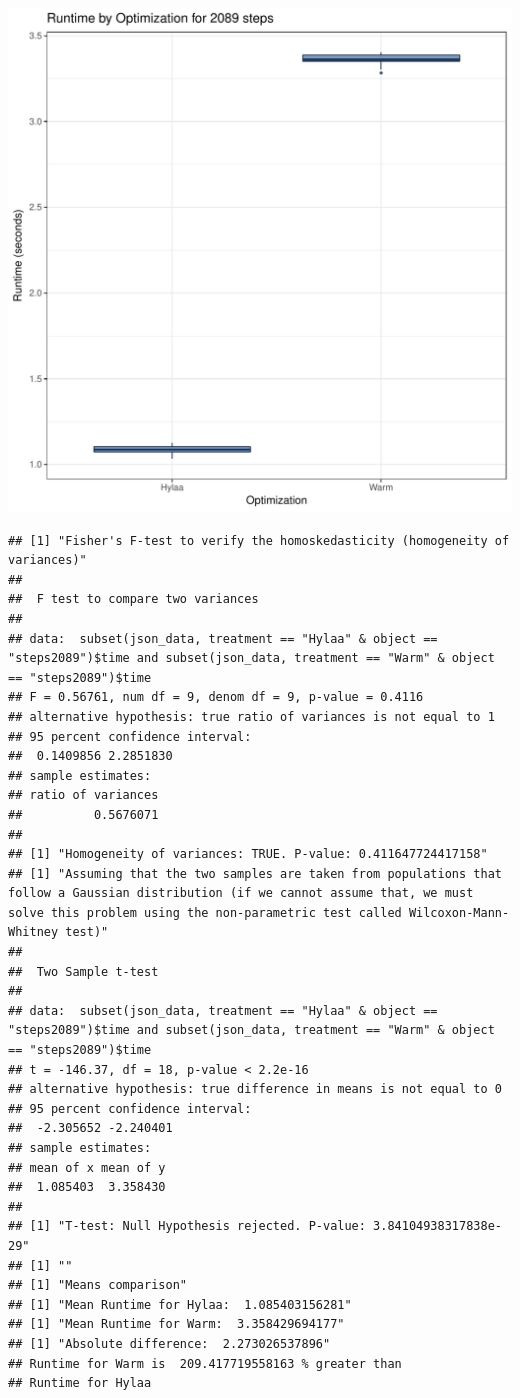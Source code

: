 \documentclass{article}\usepackage[]{graphicx}\usepackage[]{color}
\makeatletter
\def\maxwidth{ %
  \ifdim\Gin@nat@width>\linewidth
    \linewidth
  \else
    \Gin@nat@width
  \fi
}
\newenvironment{kframe}{%
 \def\at@end@of@kframe{}%
 \ifinner\ifhmode%
  \def\at@end@of@kframe{\end{minipage}}%
  \begin{minipage}{\columnwidth}%
 \fi\fi%
 \def\FrameCommand##1{\hskip\@totalleftmargin \hskip-\fboxsep
 \colorbox{shadecolor}{##1}\hskip-\fboxsep
     \hskip-\linewidth \hskip-\@totalleftmargin \hskip\columnwidth}%
 \MakeFramed {\advance\hsize-\width
   \@totalleftmargin\z@ \linewidth\hsize
   \@setminipage}}%
 {\par\unskip\endMakeFramed%
 \at@end@of@kframe}
\newenvironment{knitrout}{}{} %
\makeatother
\begin{document}
\begin{knitrout}
\color{fgcolor}
\includegraphics[width=\maxwidth]{figure/RH1_steps2089-1} 
\begin{kframe}\begin{verbatim}
## [1] "Fisher's F-test to verify the homoskedasticity (homogeneity of variances)"
## 
## 	F test to compare two variances
## 
## data:  subset(json_data, treatment == "Hylaa" & object == "steps2089")$time and subset(json_data, treatment == "Warm" & object == "steps2089")$time
## F = 0.56761, num df = 9, denom df = 9, p-value = 0.4116
## alternative hypothesis: true ratio of variances is not equal to 1
## 95 percent confidence interval:
##  0.1409856 2.2851830
## sample estimates:
## ratio of variances 
##          0.5676071 
## 
## [1] "Homogeneity of variances: TRUE. P-value: 0.411647724417158"
## [1] "Assuming that the two samples are taken from populations that follow a Gaussian distribution (if we cannot assume that, we must solve this problem using the non-parametric test called Wilcoxon-Mann-Whitney test)"
## 
## 	Two Sample t-test
## 
## data:  subset(json_data, treatment == "Hylaa" & object == "steps2089")$time and subset(json_data, treatment == "Warm" & object == "steps2089")$time
## t = -146.37, df = 18, p-value < 2.2e-16
## alternative hypothesis: true difference in means is not equal to 0
## 95 percent confidence interval:
##  -2.305652 -2.240401
## sample estimates:
## mean of x mean of y 
##  1.085403  3.358430 
## 
## [1] "T-test: Null Hypothesis rejected. P-value: 3.84104938317838e-29"
## [1] ""
## [1] "Means comparison"
## [1] "Mean Runtime for Hylaa:  1.085403156281"
## [1] "Mean Runtime for Warm:  3.358429694177"
## [1] "Absolute difference:  2.273026537896"
## Runtime for Warm is  209.417719558163 % greater than 
## Runtime for Hylaa
\end{verbatim}
\end{kframe}
\end{knitrout}
\end{document}
